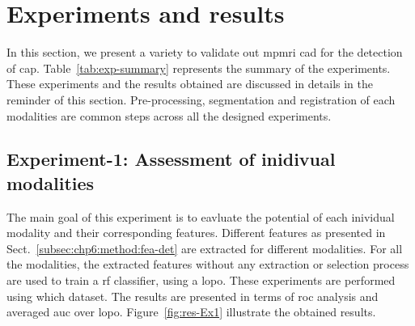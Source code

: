 \section{Experiments and results}\label{sec:chp6:exp-res}



In this section, we present a variety to validate out \ac{mpmri} \ac{cad} for the detection of \ac{cap}.
Table~\ref{tab:exp-summary} represents the summary of the experiments. 
These experiments and the results obtained are discussed in details in the reminder of this section. 
Pre-processing, segmentation and registration of each modalities are common steps across all the designed experiments.

\subsection{Experiment-1: Assessment of inidivual modalities}\label{subec:chp6:exp-res:Ex1} 
The main goal of this experiment is to eavluate the potential of each inividual modality and their corresponding features. 
Different features as presented in Sect.~\ref{subsec:chp6:method:fea-det} are extracted for different modalities. 
For all the modalities, the extracted features without any extraction or selection process are used to train a \ac{rf} classifier, using a \ac{lopo}. 
These experiments are performed using {\color{red} which dataset}.
The results are presented in terms of \ac{roc} analysis and averaged \ac{auc} over \ac{lopo}.
Figure~\ref{fig:res-Ex1} illustrate the obtained results.


